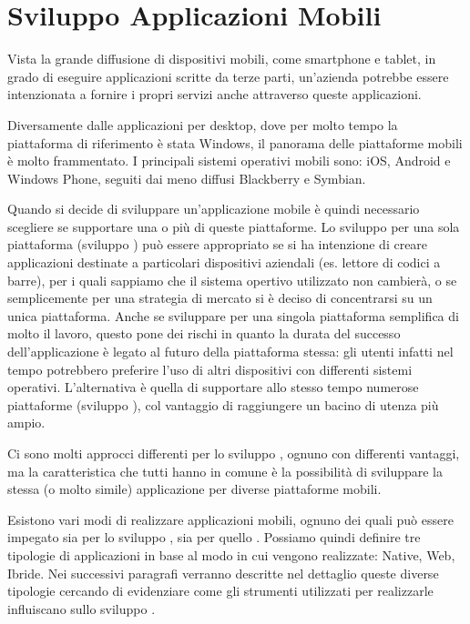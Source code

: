 \chapter{Sviluppo Applicazioni Mobili}
    Vista la grande diffusione di dispositivi mobili, come smartphone e tablet,
    in grado di eseguire applicazioni scritte da terze parti, un'azienda
    potrebbe essere intenzionata a fornire i propri servizi anche attraverso
    queste applicazioni.

    Diversamente dalle applicazioni per desktop, dove per molto tempo la
    piattaforma di riferimento è stata Windows, il panorama delle piattaforme
    mobili è molto frammentato. I principali sistemi operativi mobili sono: iOS,
    Android e Windows Phone, seguiti dai meno diffusi Blackberry e Symbian.

    Quando si decide di sviluppare un'applicazione mobile è quindi necessario
    scegliere se supportare una o più di queste piattaforme. Lo sviluppo per
    una sola piattaforma (sviluppo \singleplat{}) può essere appropriato se si ha
    intenzione di creare applicazioni destinate a particolari dispositivi
    aziendali (es. lettore di codici a barre), per i quali sappiamo che il
    sistema opertivo utilizzato non cambierà, o se semplicemente per una
    strategia di mercato si è deciso di concentrarsi su un unica piattaforma.
    Anche se sviluppare per una singola piattaforma semplifica di
    molto il lavoro, questo pone dei rischi in quanto la durata del successo
    dell'applicazione è legato al futuro della piattaforma stessa: gli utenti
    infatti nel tempo potrebbero preferire l'uso di altri dispositivi con
    differenti sistemi operativi.
    L'alternativa è quella di supportare allo stesso tempo numerose piattaforme
    (sviluppo \crossplat{}), col vantaggio di raggiungere un bacino di utenza
    più ampio.

    Ci sono molti approcci differenti per lo sviluppo \crossplat{}, ognuno con
    differenti vantaggi, ma la caratteristica che tutti hanno in comune è la
    possibilità di sviluppare la stessa (o molto simile) applicazione per
    diverse piattaforme mobili.

    Esistono vari modi di realizzare applicazioni mobili, ognuno dei quali può
    essere impegato sia per lo sviluppo \singleplat{}, sia per quello
    \crossplat{}.
    Possiamo quindi definire tre tipologie di applicazioni in base al modo in
    cui vengono realizzate: Native, Web, Ibride.
    Nei successivi paragrafi verranno descritte nel dettaglio queste diverse
    tipologie cercando di evidenziare come gli strumenti utilizzati per
    realizzarle influiscano sullo sviluppo \crossplat{}.

